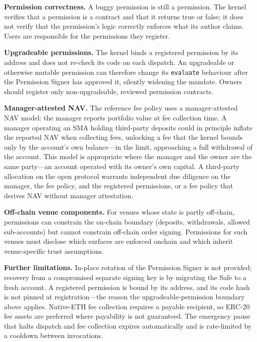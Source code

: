 \documentclass[11pt]{article}
\begin{document}
\textbf{Permission correctness.} A buggy permission is still a permission. The kernel verifies that a permission is a contract and that it returns true or false; it does not verify that the permission's logic correctly enforces what its author claims. Users are responsible for the permissions they register.

\textbf{Upgradeable permissions.} The kernel binds a registered permission by its address and does not re-check its code on each dispatch. An upgradeable or otherwise mutable permission can therefore change its \texttt{evaluate} behaviour after the Permission Signer has approved it, silently widening the mandate. Owners should register only non-upgradeable, reviewed permission contracts.

\textbf{Manager-attested NAV.} The reference fee policy uses a manager-attested NAV model: the manager reports portfolio value at fee collection time. A manager operating an SMA holding third-party deposits could in principle inflate the reported NAV when collecting fees, unlocking a fee that the kernel bounds only by the account's own balance---in the limit, approaching a full withdrawal of the account. This model is appropriate where the manager and the owner are the same party---an account operated with its owner's own capital. A third-party allocation on the open protocol warrants independent due diligence on the manager, the fee policy, and the registered permissions, or a fee policy that derives NAV without manager attestation.

\textbf{Off-chain venue components.} For venues whose state is partly off-chain, permissions can constrain the on-chain boundary (deposits, withdrawals, allowed sub-accounts) but cannot constrain off-chain order signing. Permissions for such venues must disclose which surfaces are enforced onchain and which inherit venue-specific trust assumptions.

\textbf{Further limitations.} In-place rotation of the Permission Signer is not provided; recovery from a compromised separate signing key is by migrating the Safe to a fresh account. A registered permission is bound by its address, and its code hash is not pinned at registration---the reason the upgradeable-permission boundary above applies. Native-ETH fee collection requires a payable recipient, so ERC-20 fee assets are preferred where payability is not guaranteed. The emergency pause that halts dispatch and fee collection expires automatically and is rate-limited by a cooldown between invocations.
\end{document}
